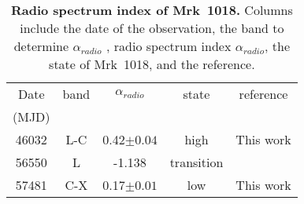 \begin{table}
\centering
\caption{{\bf Radio spectrum index of Mrk~1018.} Columns include the date of the observation, the band to determine $\alpha_{radio}$ , radio spectrum index $\alpha_{radio}$, the state of Mrk~1018, and the reference. }
\label{tab:table3}
\begin{tabular}{ccccc}
\hline
\hline
  
 Date &   band & $\alpha_{radio}$ &state  &  reference \\ 
 (MJD)&                   &                            &                 &                              
 \\ \hline

46032 & L-C & 0.42$\pm 0.04$ & high & This work \\ 
56550 & L & -1.138 & transition & \citet{2016MNRAS.460.4433H} \\ 
57481 & C-X & 0.17$\pm 0.01$ & low & This work \\ \hline

\end{tabular}
\end{table}